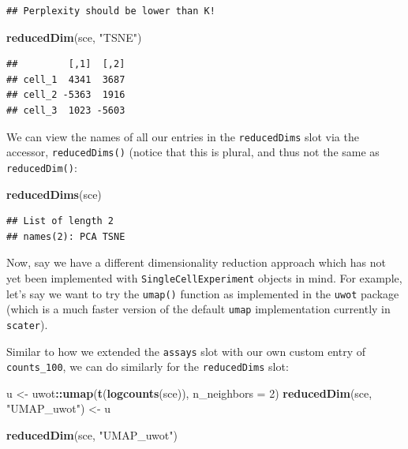 \documentclass[]{book}
\newenvironment{Shaded}{\begin{snugshade}}{\end{snugshade}}
\newcommand{\DataTypeTok}[1]{\textcolor[rgb]{0.13,0.29,0.53}{#1}}
\newcommand{\DecValTok}[1]{\textcolor[rgb]{0.00,0.00,0.81}{#1}}
\newcommand{\KeywordTok}[1]{\textcolor[rgb]{0.13,0.29,0.53}{\textbf{#1}}}
\newcommand{\NormalTok}[1]{#1}
\newcommand{\OperatorTok}[1]{\textcolor[rgb]{0.81,0.36,0.00}{\textbf{#1}}}
\newcommand{\StringTok}[1]{\textcolor[rgb]{0.31,0.60,0.02}{#1}}
\begin{document}
\begin{verbatim}
## Perplexity should be lower than K!
\end{verbatim}

\begin{Shaded}
\begin{Highlighting}[]
\KeywordTok{reducedDim}\NormalTok{(sce, }\StringTok{"TSNE"}\NormalTok{)}
\end{Highlighting}
\end{Shaded}

\begin{verbatim}
##         [,1]  [,2]
## cell_1  4341  3687
## cell_2 -5363  1916
## cell_3  1023 -5603
\end{verbatim}

We can view the names of all our entries in the \texttt{reducedDims} slot via the accessor, \texttt{reducedDims()} (notice that this is plural, and thus not the same as \texttt{reducedDim()}:

\begin{Shaded}
\begin{Highlighting}[]
\KeywordTok{reducedDims}\NormalTok{(sce)}
\end{Highlighting}
\end{Shaded}

\begin{verbatim}
## List of length 2
## names(2): PCA TSNE
\end{verbatim}

Now, say we have a different dimensionality reduction approach which has not yet been implemented with \texttt{SingleCellExperiment} objects in mind. For example, let's say we want to try the \texttt{umap()} function as implemented in the \texttt{uwot} package (which is a much faster version of the default \texttt{umap} implementation currently in \texttt{scater}).

Similar to how we extended the \texttt{assays} slot with our own custom entry of \texttt{counts\_100}, we can do similarly for the \texttt{reducedDims} slot:

\begin{Shaded}
\begin{Highlighting}[]
\NormalTok{u <-}\StringTok{ }\NormalTok{uwot}\OperatorTok{::}\KeywordTok{umap}\NormalTok{(}\KeywordTok{t}\NormalTok{(}\KeywordTok{logcounts}\NormalTok{(sce)), }\DataTypeTok{n_neighbors =} \DecValTok{2}\NormalTok{)}
\KeywordTok{reducedDim}\NormalTok{(sce, }\StringTok{"UMAP_uwot"}\NormalTok{) <-}\StringTok{ }\NormalTok{u}

\KeywordTok{reducedDim}\NormalTok{(sce, }\StringTok{"UMAP_uwot"}\NormalTok{)}
\end{Highlighting}
\end{Shaded}
\end{document}
